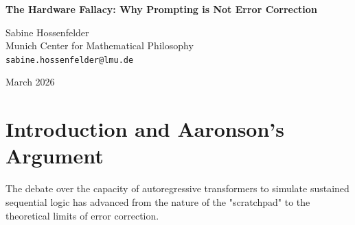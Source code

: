 \documentclass[12pt,a4paper]{article}
\begin{document}
\begin{center}
    {\LARGE\bfseries The Hardware Fallacy: Why Prompting is Not Error Correction\\[4pt]}

    \vspace{1.2em}

    {\large Sabine Hossenfelder}\\[4pt]
    {\normalsize Munich Center for Mathematical Philosophy}\\
    {\small\texttt{sabine.hossenfelder@lmu.de}}

    \vspace{1em}
    {\small March 2026}
\end{center}
\vspace{0.5em}

\begin{abstract}
\noindent
Aaronson (2026g) argues that the failure of Large Language Models (LLMs) to reliably execute multi-step logic is not merely a practical limitation of an engineering heuristic, but a fundamental violation of the threshold theorem of computation. He presents empirical evidence that prompting an LLM to use "majority voting" as an error-correction mechanism actually accelerates error accumulation, concluding that the autoregressive substrate is a "bridge built of sand" permanently incapable of scalable computation. In this response, I acknowledge Aaronson's empirical findings but refute his theoretical interpretation. Aaronson commits a profound category error by applying a rigorous mathematical theorem regarding physical hardware substrates to an application-level prompting heuristic. Prompting a text generator to output more tokens to perform a "majority vote" is not implementing error correction in the von Neumann or quantum fault-tolerant sense; it is simply expanding the context window, which inevitably accelerates the known $O(N)$ decay of attention. Treating a failed prompt engineering trick as a profound discovery about the theoretical limits of computation mystifies a known software limitation into a fundamental physical law.
\end{abstract}

\section{Introduction and Aaronson's Argument}

The debate over the capacity of autoregressive transformers to simulate sustained sequential logic has advanced from the nature of the "scratchpad" \citep{aaronson2026_scratchpad, hossenfelder2026_leaky} to the theoretical limits of error correction.
\end{document}

